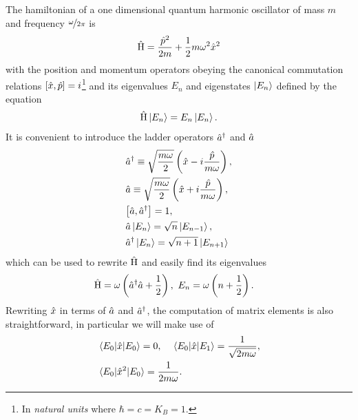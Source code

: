 The hamiltonian of a one dimensional quantum harmonic oscillator of mass $m$ and frequency $\nicefrac{\omega}{2\pi}$ is
\begin{align}
  \label{eqn:1}
  \hat{\operatorname{H}}= \frac{\hat{p}^{2}}{2m} + \frac{1}{2}m\omega  ^2 \hat{x}^2
\end{align}
with the position and momentum operators obeying the canonical commutation relations $\comm{\x}{\p}=i$\footnote{In \textit{natural units} where $\hbar = c = K_{B} = 1$.}
and its eigenvalues $E_{n}$ and eigenstates $\ket{E_{n}}$ defined by the equation
\begin{align}
  \label{eqn:diago}
  \hat{\operatorname{H}} \ket{E_{n}} = E_{n}\ket{E_{n}}.
\end{align}
It is convenient to introduce the ladder operators $\hat{a}^\dagger$ and $\hat{a}$
\begin{align}
  &\ad \equiv \sqrt{\frac{m\w}{2}}\left(\hat{x} - i\frac{\p}{m\w}\right),\\
  &\a \equiv \sqrt{\frac{m\w}{2}}\left(\x + i \frac{\p}{m\w}\right),\\
  &\comm{\a}{\ad}=1,\\
  &\a \ket{E_{n}} = \sqrt{n}\ket{E_{n-1}},\\
  &\ad  \ket{E_{n}} = \sqrt{n+1}\ket{E_{n+1}}
\end{align}
which can be used to rewrite $\hat{\operatorname{H}}$ and easily find its eigenvalues
\begin{align}
  &\hat{\operatorname{H}} = \omega \left(\hat{a}^\dagger \hat{a} + \frac{1}{2}\right), \
  E_{n} = \omega \left(n+\frac{1}{2}\right).
\end{align}
Rewriting $\hat{x}$ in terms of $\hat{a}$ and $\hat{a}^\dagger$, the computation of matrix elements is also straightforward,
in particular we will make use of
\begin{align}
  &\ev{\hat{x}}{E_{0}}=0,\quad
  \mel{E_{0}}{\hat{x}}{E_{1}} = \frac{1}{\sqrt{2m\w}}, \notag\\
  &\ev{\hat{x}^2}{E_{0}}= \frac{1}{2m\w} \label{eqn:mat}.
\end{align}
